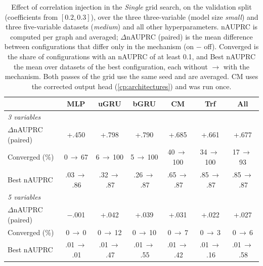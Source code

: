 \begin{table}[ht]
    \centering
    \small
    \setlength{\tabcolsep}{3pt}
    \begin{tabular}{lccccc|c}
    \toprule
        ~ & \textbf{MLP} & \textbf{uGRU} & \textbf{bGRU} & \textbf{CM} & \textbf{Trf} & \textbf{All} \\
    \midrule
        \textit{3 variables} & \multicolumn{6}{c}{} \\
        \quad $\Delta$nAUPRC (paired) & +.450 & +.798 & +.790 & +.685 & +.661 & +.677 \\
        \quad Converged (\%) & 0\,$\to$\,67 & 6\,$\to$\,100 & 5\,$\to$\,100 & 40\,$\to$\,100 & 34\,$\to$\,100 & 17\,$\to$\,93 \\
        \quad Best nAUPRC & .03\,$\to$\,.86 & .32\,$\to$\,.87 & .26\,$\to$\,.87 & .65\,$\to$\,.87 & .85\,$\to$\,.87 & .85\,$\to$\,.87 \\
        \textit{5 variables} & \multicolumn{6}{c}{} \\
        \quad $\Delta$nAUPRC (paired) & $-$.001 & +.042 & +.039 & +.031 & +.022 & +.027 \\
        \quad Converged (\%) & 0\,$\to$\,0 & 0\,$\to$\,12 & 0\,$\to$\,10 & 0\,$\to$\,7 & 0\,$\to$\,3 & 0\,$\to$\,6 \\
        \quad Best nAUPRC & .01\,$\to$\,.01 & .01\,$\to$\,.47 & .01\,$\to$\,.55 & .01\,$\to$\,.42 & .01\,$\to$\,.16 & .01\,$\to$\,.58 \\
    \bottomrule
    \end{tabular}
    \caption{Effect of correlation injection in the \emph{Single} grid search, on the validation split (coefficients from $[0.2,0.3]$), over the three three-variable (model size \emph{small}) and three five-variable datasets (\emph{medium}) and all other hyperparameters. nAUPRC is computed per graph and averaged; $\Delta$nAUPRC (paired) is the mean difference between configurations that differ only in the mechanism (on $-$ off). Converged is the share of configurations with an nAUPRC of at least 0.1, and Best nAUPRC the mean over datasets of the best configuration, each without $\to$ with the mechanism. Both passes of the grid use the same seed and are averaged. CM uses the corrected output head (\cref{cp:architectures}) and was run once.}
    \label{tab:cp:ci}
\end{table}
